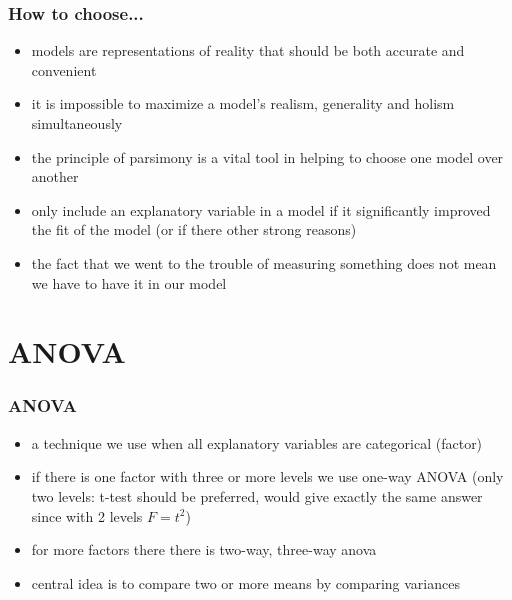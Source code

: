\begin{frame}\frametitle{How to choose...}
\begin{itemize}
\item models are representations of reality that should be both accurate and convenient
\item it is impossible to maximize a model’s realism, generality and holism simultaneously
\item the principle of parsimony is a vital tool in helping to choose one model over another
\item only include an explanatory variable in a model if it significantly improved the fit of the model (or if there other strong reasons)
\item the fact that we went to the trouble of measuring something does not mean we have to have it in our model
\end{itemize}
\end{frame}

\section{ANOVA}
\begin{frame}\frametitle{ANOVA}
  \begin{itemize}
  \item a technique we use when all explanatory variables are categorical (factor)
  \item if there is one factor with three or more levels we use one-way ANOVA (only two levels: t-test should be preferred, would give exactly the same answer since with 2 levels $F=t^2$)
  \item for more factors there there is two-way, three-way anova 
  \item central idea is to compare two or more means by comparing variances
  \end{itemize}
\end{frame}

